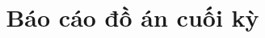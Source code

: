 %
%
%
% 
%
\title{Báo cáo đồ án cuối kỳ}

\documentclass[12pt]{article}
\usepackage[T5]{fontenc}
\usepackage[utf8]{inputenc}
\usepackage[vietnamese,english]{babel}
\usepackage{amsmath}
\usepackage{graphicx}
\usepackage[colorinlistoftodos]{todonotes}
\usepackage{listings}
\usepackage{hyperref}
\hypersetup{
    colorlinks=true,
    linkcolor=blue,
    filecolor=magenta,      
    urlcolor=cyan,
}




